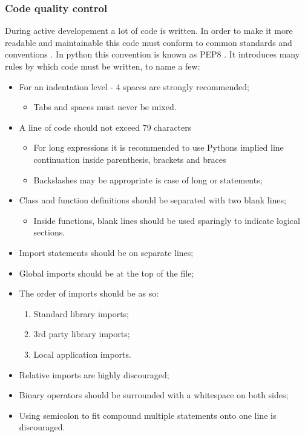 \documentclass[12pt, fleqn, a4paper]{article}
\begin{document}
\subsubsection{Code quality control}
During active developement a lot of code is written. In order to make it more readable and maintainable this code must conform to common standards and conventions \citep{martin_2018}. In python this convention is known as PEP8 \citep{pep8} \citep{pep20}. It introduces many rules by which code must be written, to name a few:
\begin{itemize}
	\item For an indentation level - 4 spaces are strongly recommended;
		\begin{itemize}
			\item Tabs and spaces must never be mixed.
		\end{itemize}
	\item A line of code should not exceed 79 characters 
		\begin{itemize} 
			\item For long expressions it is recommended to use Pythons implied line continuation inside parenthesis, brackets and braces 
			\item Backslashes may be appropriate is case of long  or  statements;
		\end{itemize}
	\item Class and function definitions should be separated with two blank lines;
		\begin{itemize}
			\item Inside functions, blank lines should be used sparingly to indicate logical sections.
		\end{itemize}
	\item Import statements should be on separate lines;
	\item Global imports should be at the top of the file;
	\item The order of imports should be as so:
		\begin{enumerate}
			\item Standard library imports;
			\item 3rd party library imports;
			\item Local application imports.
		\end{enumerate}
	\item Relative imports are highly discouraged;
	\item Binary operators should be surrounded with a whitespace on both sides;
	\item Using semicolon to fit compound multiple statements onto one line is discouraged.
\end{itemize}
\end{document}
